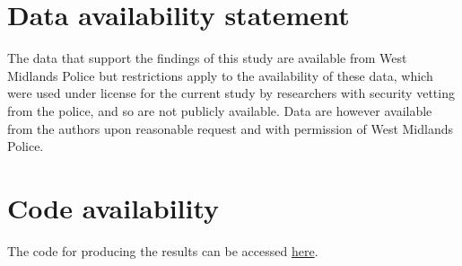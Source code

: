 \documentclass[12pt, a4paper]{article}
\begin{document}
\newpage




\section*{Data availability statement}

The data that support the findings of this study are available from West Midlands Police
but restrictions apply to the availability of these data, which were used under license
for the current study by researchers with security vetting from the police, and so are not publicly available. Data are however available from the authors upon reasonable request and with permission of West Midlands Police.

\section*{Code availability}

The code for producing the results can be accessed \href{https://osf.io/kg9yr/?view_only=172a33b467bd4566b2e5dea0e2f59f8c}{here}. 

%

\newpage



\newpage



\clearpage
\end{document}
